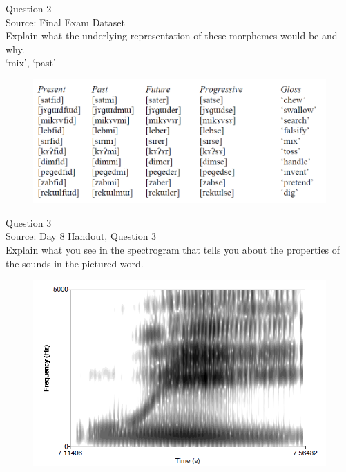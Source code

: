 \documentclass[12pt]{article}
\begin{document}
\newpage

{\large Question 2}\\

Source: Final Exam Dataset\\

Explain what the underlying representation of these morphemes would be and why.\\

`mix', `past'

\begin{figure}[H]
\includegraphics{../images/final_dataset.png}
\end{figure}

\newpage

{\large Question 3}\\

Source: Day 8 Handout, Question 3\\

Explain what you see in the spectrogram that tells you about the properties of the sounds in the pictured word.\\

\begin{figure}[H]
\includegraphics{../images/spectrogram_we.png}
\end{figure}
\end{document}
